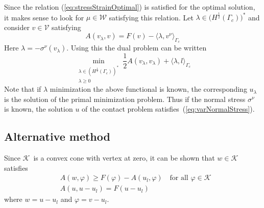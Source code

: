 \documentclass[12pt,a4paper]{article}
\numberwithin{equation}{section}
\numberwithin{table}{section}
\numberwithin{figure}{section}
\newcommand{\W}{\ensuremath{\mathcal{W}}}
\newcommand{\half}{\ensuremath{\frac{1}{2}}}
\newcommand{\V}{\ensuremath{\mathcal{V}}}
\newcommand{\K}{\ensuremath{\mathcal{K}}}
\renewcommand{\phi}{\varphi}
\providecommand{\dualp}[2]{\langle #1, #2 \rangle}
\renewcommand{\forall}{\text{for all }}
\begin{document}
Since the relation (\ref{eq:stressStrainOptimal}) is satisfied for the optimal solution,
it makes sense to look for $\mu\in\W$ satisfying this relation.  Let $\lambda \in
\bigl(H^\half(\Gamma_c)\bigr)^*$ and consider $v \in \V$ satisfying
\begin{equation}
  \label{eq:varNormalStress}
  A(v_\lambda, v) = F(v) - \dualp{\lambda}{v^\nu}_{\Gamma_c}
\end{equation}
Here $\lambda = -\sigma^\nu(v_\lambda)$.  Using this the dual problem can be written
\begin{equation}
  \min_{\substack{
      \lambda\in ( H^\half(\Gamma_c) )^* \\
      \lambda \ge 0}
  } \half A(v_\lambda, v_\lambda) + \dualp{\lambda}{l}_{\Gamma_c}
\end{equation}
Note that if $\lambda$ minimization the above functional is known, the corresponding
$u_\lambda$ is the solution of the primal minimization problem.  Thus if the normal stress
$\sigma^\nu$ is known, the solution $u$ of the contact problem
satisfies~(\ref{eq:varNormalStress}).


\subsection{Alternative method}

Since \K\ is a convex cone with vertex at zero, it can be shown that $w\in \K$
satisfies
\begin{align}
  &A(w,\phi) \ge F(\phi) - A(u_l,\phi) \quad\forall{\phi\in \K} \\
  &A(u,u-u_l)  = F(u-u_l)
\end{align}
where $w=u-u_l$ and $\phi=v-u_l$.
\end{document}
